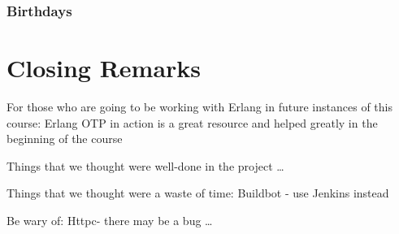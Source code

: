 \documentclass[11pt]{report}
\begin{document}
\subsection{Birthdays}
\chapter{Closing Remarks}

For those who are going to be working with Erlang in future instances of this course:
Erlang OTP in action is a great resource and helped greatly in the beginning of the course

Things that we thought were well-done in the project \ldots

Things that we thought were a waste of time:
Buildbot - use Jenkins instead


Be wary of:
Httpc- there may be a bug \ldots
\end{document}
